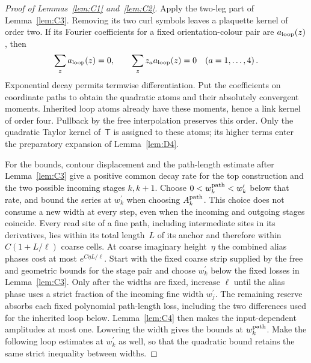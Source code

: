 \begin{proof}[Proof of Lemmas~\ref{lem:C1} and~\ref{lem:C2}]
Apply the two-leg part of Lemma~\ref{lem:C3}. Removing its two curl symbols leaves a plaquette kernel of order two. If its Fourier coefficients for a fixed orientation-colour pair are $a_{\rm loop}(z)$, then
\begin{equation*}
\sum_z a_{\rm loop}(z)=0,\qquad\sum_z z_a a_{\rm loop}(z)=0\quad(a=1,\ldots,4)\,.
\end{equation*}
Exponential decay permits termwise differentiation. Put the coefficients on coordinate paths to obtain the quadratic atoms and their absolutely convergent moments. Inherited loop atoms already have these moments, hence a link kernel of order four. Pullback by the free interpolation preserves this order. Only the quadratic Taylor kernel of~$\mathsf T$ is assigned to these atoms; its higher terms enter the preparatory expansion of Lemma~\ref{lem:D4}.

For the bounds, contour displacement and the path-length estimate after Lemma~\ref{lem:C3} give a positive common decay rate for the top construction and the two possible incoming stages $k,k+1$. Choose $0<w_k^{\rm path}<w_k^\prime$ below that rate, and bound the series at $w_k^\prime$ when choosing $A_k^{\rm path}$. This choice does not consume a new width at every step, even when the incoming and outgoing stages coincide. Every read site of a fine path, including intermediate sites in its derivatives, lies within its total length~$L$ of its anchor and therefore within $C(1+L/\ell)$ coarse cells. At coarse imaginary height~$\eta$ the combined alias phases cost at most $e^{C\eta L/\ell}$. Start with the fixed coarse strip supplied by the free and geometric bounds for the stage pair and choose $w_k^\prime$ below the fixed losses in Lemma~\ref{lem:C3}. Only after the widths are fixed, increase $\ell$ until the alias phase uses a strict fraction of the incoming fine width $w_j^\prime$. The remaining reserve absorbs each fixed polynomial path-length loss, including the two differences used for the inherited loop below. Lemma~\ref{lem:C4} then makes the input-dependent amplitudes at most one. Lowering the width gives the bounds at $w_k^{\rm path}$. Make the following loop estimates at $w_k^\prime$ as well, so that the quadratic bound retains the same strict inequality between widths.


\end{proof}
